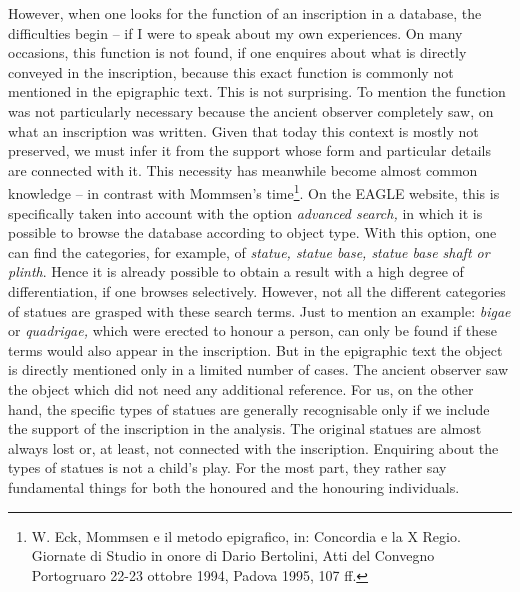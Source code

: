 \documentclass[amsthm,ebook]{saparticle}
\begin{document}
However, when one looks for the function of an inscription in a database, the difficulties 
begin – if I were to speak about my own experiences. On many occasions, this 
function is not found, if one enquires about what is directly conveyed in the inscription, 
because this exact function is commonly not mentioned in the epigraphic text. This 
is not surprising. To mention the function was not particularly necessary because 
the ancient observer completely saw, on what an inscription was written. Given 
that today this context is mostly not preserved, we must infer it from the support 
whose form and particular details are connected with it. This necessity has meanwhile 
become almost common knowledge – in contrast with Mommsen's time\footnote{W. Eck, Mommsen e il metodo epigrafico, in: Concordia e la X Regio. Giornate di Studio in onore di Dario Bertolini, Atti del Convegno Portogruaro 22-23 ottobre 1994, Padova 1995, 107 ff.}. On the EAGLE 
website, this is specifically taken into account with the option \textit{advanced 
search, }in which it is possible to browse the database according to object type. 
With this option, one can find the categories, for example, of \textit{statue, 
statue base, statue base shaft or plinth}. Hence it is already possible to obtain 
a result with a high degree of differentiation, if one browses selectively. However, 
not all the different categories of statues are grasped with these search terms. 
Just to mention an example: \textit{bigae }or \textit{quadrigae, }which were erected 
to honour a person, can only be found if these terms would also appear in the inscription. 
But in the epigraphic text the object is directly mentioned only in a limited number 
of cases. The ancient observer saw the object which did not need any additional 
reference. For us, on the other hand, the specific types of statues are generally 
recognisable only if we include the support of the inscription in the analysis. 
The original statues are almost always lost or, at least, not connected with the 
inscription. Enquiring about the types of statues is not a child's play. For the 
most part, they rather say fundamental things for both the honoured and the honouring 
individuals. 
\end{document}
